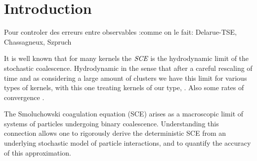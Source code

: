 \documentclass[11pt,a4paper]{article}
\title{}      %
\author{
   Sebastian Baudelet
}
\title{}
\date{}
\newcommand{\SCE}{\emph{SCE}}
\begin{document}
\section{Introduction}
Pour controler des erreurs entre observables :comme on le fait: Delarue-TSE, Chassagneux, Szpruch

It is well known that for many kernels the \(\SCE\) is the hydrodynamic limit of the stochastic coalescence. Hydrodynamic in the sense that after a careful rescaling of time and as considering a large amount of clusters we have this limit for various types of kernels, \cite{norrisClusterCoagulation2000,norris1999smoluchowski,deaconuPureJumpMarkov2002,deaconu2000smoluchowski,fournierConvergenceMarcusLushnikov2004,fournierStochasticCoalescenceHomogeneouslike2009} with this one treating kernels of our type, \cite{norris1999smoluchowski}. Also some rates of convergence \cite{cepedaSmoluchowskisEquationRate2011a}.


The Smoluchowski coagulation equation (SCE) arises as a macroscopic limit of systems of particles undergoing binary coalescence. Understanding this connection allows one to rigorously derive the deterministic SCE from an underlying stochastic model of particle interactions, and to quantify the accuracy of this approximation.
\end{document}
